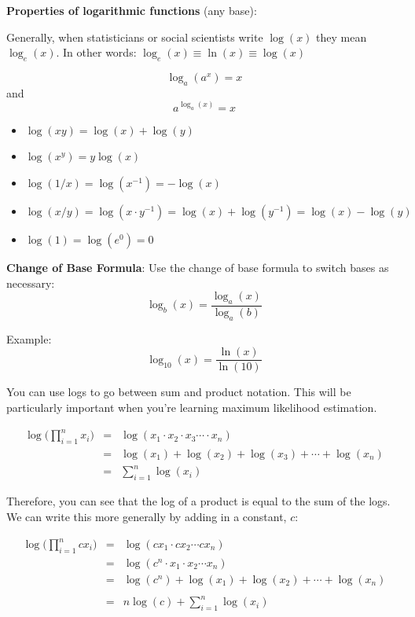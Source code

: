 \documentclass[]{book}
\providecommand{\tightlist}{%
  \setlength{\itemsep}{0pt}\setlength{\parskip}{0pt}}
\theoremstyle{definition}
\theoremstyle{definition}
\theoremstyle{definition}
\theoremstyle{remark}
\begin{document}
\textbf{Properties of logarithmic functions} (any base):

Generally, when statisticians or social scientists write \(\log(x)\)
they mean \(\log_e(x)\). In other words:
\(\log_e(x) \equiv \ln(x) \equiv \log(x)\)

\[\log_a(a^x)=x\] and \[a^{\log_a(x)}=x\]

\begin{itemize}
\tightlist
\item
  \(\log(x y)=\log(x)+\log(y)\)
\item
  \(\log(x^y)=y\log(x)\)
\item
  \(\log(1/x)=\log(x^{-1})=-\log(x)\)
\item
  \(\log(x/y)=\log(x\cdot y^{-1})=\log(x)+\log(y^{-1})=\log(x)-\log(y)\)
\item
  \(\log(1)=\log(e^0)=0\)
\end{itemize}

\textbf{Change of Base Formula}: Use the change of base formula to
switch bases as necessary: \[\log_b(x) = \frac{\log_a(x)}{\log_a(b)}\]

Example: \[\log_{10}(x) = \frac{\ln(x)}{\ln(10)}\]

You can use logs to go between sum and product notation. This will be
particularly important when you're learning maximum likelihood
estimation.

\begin{eqnarray*}
            \log \bigg(\prod\limits_{i=1}^n x_i \bigg) &=& \log(x_1 \cdot x_2 \cdot x_3 \cdots \cdot x_n)\\
            &=& \log(x_1) + \log(x_2) + \log(x_3) + \cdots + \log(x_n)\\
            &=& \sum\limits_{i=1}^n \log (x_i)
\end{eqnarray*}

Therefore, you can see that the log of a product is equal to the sum of
the logs. We can write this more generally by adding in a constant,
\(c\):

\begin{eqnarray*}
            \log \bigg(\prod\limits_{i=1}^n c x_i\bigg) &=& \log(cx_1 \cdot cx_2 \cdots cx_n)\\
            &=& \log(c^n \cdot x_1 \cdot x_2 \cdots x_n)\\
            &=& \log(c^n) + \log(x_1) + \log(x_2) + \cdots + \log(x_n)\\\\
            &=& n \log(c) +  \sum\limits_{i=1}^n \log (x_i)\\
\end{eqnarray*}
\end{document}

